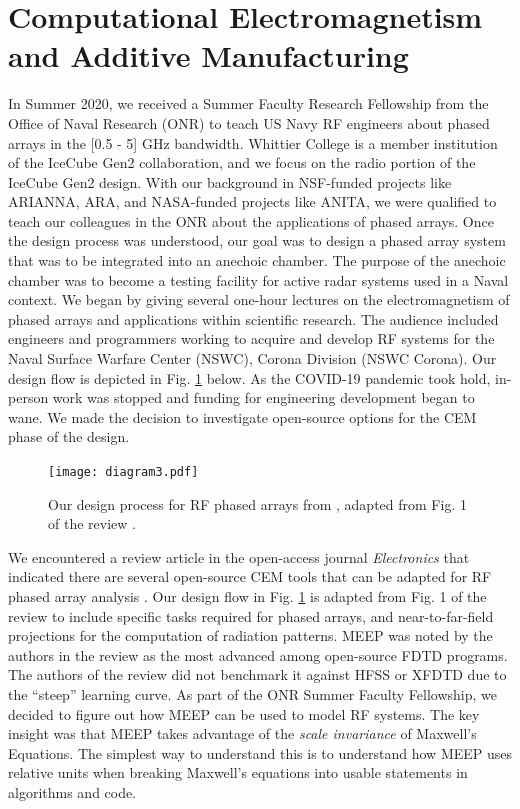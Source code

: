 \documentclass[../../main.tex]{subfiles}
\begin{document}
\section{Computational Electromagnetism and Additive Manufacturing}
\label{sec:cem}

In Summer 2020, we received a Summer Faculty Research Fellowship from the Office of Naval Research (ONR) to teach US Navy RF engineers about phased arrays in the [0.5 - 5] GHz bandwidth.  Whittier College is a member institution of the IceCube Gen2 collaboration, and we focus on the radio portion of the IceCube Gen2 design.  With our background in NSF-funded projects like ARIANNA, ARA, and NASA-funded projects like ANITA, we were qualified to teach our colleagues in the ONR about the applications of phased arrays.  Once the design process was understood, our goal was to design a phased array system that was to be integrated into an anechoic chamber.  The purpose of the anechoic chamber was to become a testing facility for active radar systems used in a Naval context.  We began by giving several one-hour lectures on the electromagnetism of phased arrays and applications within scientific research.  The audience included engineers and programmers working to acquire and develop RF systems for the Naval Surface Warfare Center (NSWC), Corona Division (NSWC Corona).  Our design flow is depicted in Fig. \ref{fig:design} below.  As the COVID-19 pandemic took hold, in-person work was stopped and funding for engineering development began to wane.  We made the decision to investigate open-source options for the CEM phase of the design. \\ \vspace{2.5mm}

\begin{figure}
\centering
\texttt{[image: diagram3.pdf]}
\caption{\label{fig:design}  Our design process for RF phased arrays from \cite{electronics10040415}, adapted from Fig. 1 of the review \cite{10.3390/electronics8121506}.}
\end{figure}

We encountered a review article in the open-access journal \textit{Electronics} that indicated there are several open-source CEM tools that can be adapted for RF phased array analysis \cite{electronics10040415}.  Our design flow in Fig. \ref{fig:design} is adapted from Fig. 1 of the review to include specific tasks required for phased arrays, and near-to-far-field projections for the computation of radiation patterns.  MEEP was noted by the authors in the review as the most advanced among open-source FDTD programs.  The authors of the review did not benchmark it against HFSS or XFDTD due to the ``steep'' learning curve.  As part of the ONR Summer Faculty Fellowship, we decided to figure out how MEEP can be used to model RF systems.  The key insight was that MEEP takes advantage of the \textit{scale invariance} of Maxwell's Equations.  The simplest way to understand this is to understand how MEEP uses relative units when breaking Maxwell's equations into usable statements in algorithms and code. \\ \vspace{2.5mm}
\end{document}

